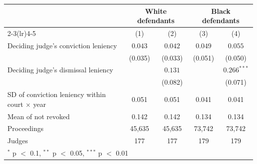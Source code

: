 \begin{tabular}{lcccc}
\toprule
 & \multicolumn{2}{c}{White defendants} & \multicolumn{2}{c}{Black defendants} \\
\cmidrule(lr){2-3}\cmidrule(lr){4-5}
 & (1) & (2) & (3) & (4) \\
\midrule
Deciding judge's conviction leniency & $0.043$ & $0.042$ & $0.049$ & $0.055$ \\
 & (0.035) & (0.033) & (0.051) & (0.050) \\
Deciding judge's dismissal leniency &  & $0.131$ &  & $0.266^{***}$ \\
 &  & (0.082) &  & (0.071) \\
\midrule
SD of conviction leniency within court $\times$ year & 0.051 & 0.051 & 0.041 & 0.041 \\
Mean of not revoked & 0.142 & 0.142 & 0.134 & 0.134 \\
Proceedings & 45,635 & 45,635 & 73,742 & 73,742 \\
Judges & 177 & 177 & 179 & 179 \\
\bottomrule
\multicolumn{5}{l}{\footnotesize $^{*}$ p $<$ 0.1, $^{**}$ p $<$ 0.05, $^{***}$ p $<$ 0.01} \\
\end{tabular}
